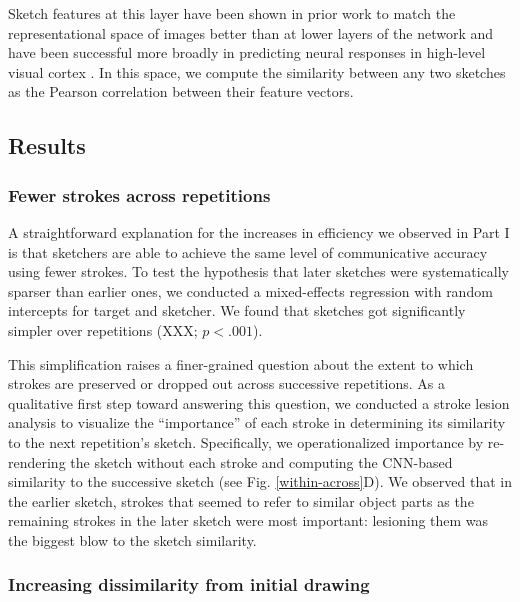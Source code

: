 \documentclass[10pt,letterpaper]{article}
\begin{document}
Sketch features at this layer have been shown in prior work to match the representational space of images better than at lower layers of the network \cite{FanCommon2018} and have been successful more broadly in predicting neural responses in high-level visual cortex \cite{yamins2014performance}.
In this space, we compute the similarity between any two sketches as the Pearson correlation between their feature vectors.

\subsection{Results}

\subsubsection{Fewer strokes across repetitions} A straightforward explanation for the increases in efficiency we observed in Part I is that sketchers are able to achieve the same level of communicative accuracy using fewer strokes.
To test the hypothesis that later sketches were systematically sparser than earlier ones, we conducted a mixed-effects regression with random intercepts for target and sketcher.
We found that sketches got significantly simpler over repetitions (XXX; $p < .001$).

This simplification raises a finer-grained question about the extent to which strokes are preserved or dropped out across successive repetitions.
As a qualitative first step toward answering this question, we conducted a stroke lesion analysis to visualize the ``importance'' of each stroke in determining its similarity to the next repetition's sketch.
Specifically, we operationalized importance by re-rendering the sketch without each stroke and computing the CNN-based similarity to the successive sketch (see Fig. \ref{within-across}D).
We observed that in the earlier sketch, strokes that seemed to refer to similar object parts as the remaining strokes in the later sketch were most important: lesioning them was the biggest blow to the sketch similarity.  %

\subsubsection{Increasing dissimilarity from initial drawing}
\end{document}
